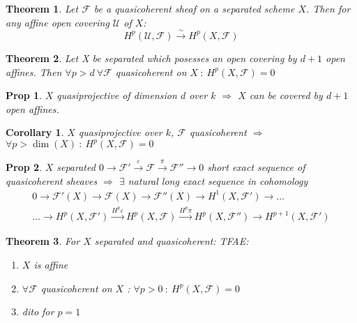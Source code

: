 \documentclass[a4paper, 12pt]{article}
\newcommand{\ca}[1]{\mathcal{#1}}
\newcommand{\caf}{\mathcal{F}}
\newtheorem*{prop}{Prop}
\newtheorem*{thm}{Theorem}
\newtheorem*{cor}{Corollary}
\begin{document}
	\begin{thm}
		Let $ \caf $ be a quasicoherent sheaf on a separated scheme $ X $. Then for any affine open covering $ \ca{U} $ of $ X $:
		\[ H^p(\ca{U}, \caf) \xrightarrow{\sim} H^p(X,\caf) \]
	\end{thm}
	
	\begin{thm}
		Let X be separated which posesses an open covering by $ d+1 $ open affines.
		Then $ \forall p > d \: \forall \caf $ quasicoherent on $ X \: : \: H^p(X,\caf ) =0 $ 
	\end{thm}
	
	\begin{prop}
		$ X $ quasiprojective of dimension $ d$ over $ k $ $ \Rightarrow $ $ X $ can be covered by $ d +1 $ open affines.
	\end{prop}
	
	\begin{cor}
		$ X $ quasiprojective over $ k $, $ \caf $ quasicoherent $ \Rightarrow $ $ \forall p > \dim(X) \: :\: H^p(X,\caf)=0 $
	\end{cor}
	
	\begin{prop}
		$ X $ separated $ 0 \rightarrow \caf' \xrightarrow{\varepsilon} \caf \xrightarrow{\pi} \caf'' \rightarrow 0 $ short exact sequence of quasicoherent sheaves $ \Rightarrow $ $ \exists $ natural long exact sequence in cohomology
		\begin{multline*}
 0 \rightarrow \caf'(X) \rightarrow \caf(X) \rightarrow\caf''(X) \rightarrow H^1(X, \caf') \rightarrow \dots \\ \dots \rightarrow H^p(X,\caf') \xrightarrow{H^p\varepsilon} H^p(X, \caf) \xrightarrow{H^p\pi} H^p(X,\caf'') \rightarrow H^{p+1}(X,\caf') 
		\end{multline*}
	\end{prop}
		
	\begin{thm}
		For $ X $ separated and quasicoherent: TFAE:
		
		\begin{enumerate}
			\item $ X $ is affine
			\item $  \forall \caf  $ quasicoherent on $ X $ : $ \forall p> 0 \: : \: H^p(X, \caf ) =0  $
			\item dito for $ p=1 $
		\end{enumerate}
	\end{thm}
	
	
	
\end{document}
